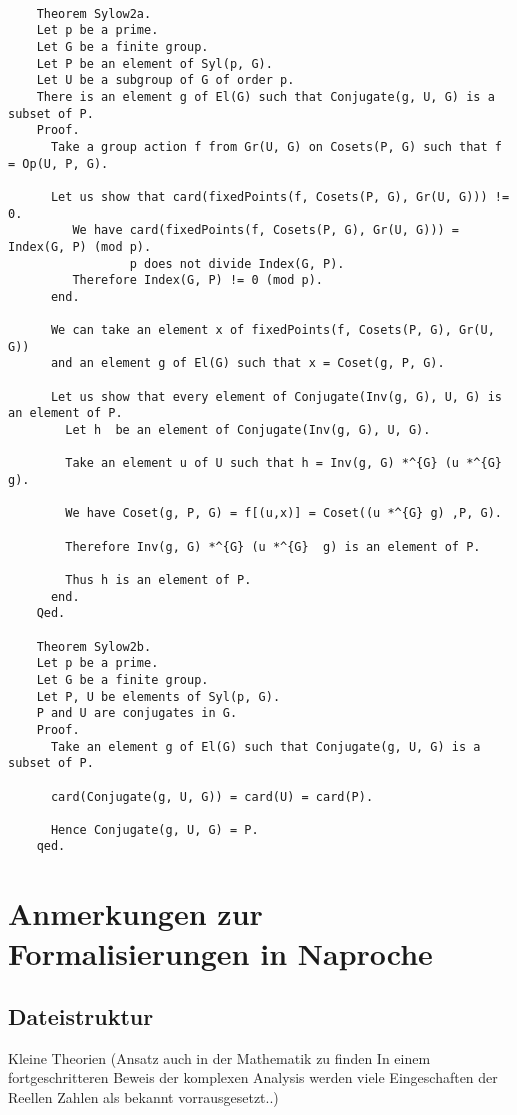 \documentclass[a4paper,12pt]{scrartcl}
\begin{document}
\begin{lstlisting}
	
	Theorem Sylow2a.
	Let p be a prime.
	Let G be a finite group.
	Let P be an element of Syl(p, G).
	Let U be a subgroup of G of order p.
	There is an element g of El(G) such that Conjugate(g, U, G) is a subset of P.
	Proof.
	  Take a group action f from Gr(U, G) on Cosets(P, G) such that f = Op(U, P, G).
	  
	  Let us show that card(fixedPoints(f, Cosets(P, G), Gr(U, G))) !=  0.
		 We have card(fixedPoints(f, Cosets(P, G), Gr(U, G))) = Index(G, P) (mod p).
				 p does not divide Index(G, P).
		 Therefore Index(G, P) != 0 (mod p).
	  end.
	  
	  We can take an element x of fixedPoints(f, Cosets(P, G), Gr(U, G))
	  and an element g of El(G) such that x = Coset(g, P, G).
	  
	  Let us show that every element of Conjugate(Inv(g, G), U, G) is an element of P.
		Let h  be an element of Conjugate(Inv(g, G), U, G).
	
		Take an element u of U such that h = Inv(g, G) *^{G} (u *^{G}  g).
	
		We have Coset(g, P, G) = f[(u,x)] = Coset((u *^{G} g) ,P, G).
	
		Therefore Inv(g, G) *^{G} (u *^{G}  g) is an element of P.
	
		Thus h is an element of P.
	  end.
	Qed.
	
	Theorem Sylow2b.
	Let p be a prime.
	Let G be a finite group.
	Let P, U be elements of Syl(p, G).
	P and U are conjugates in G.
	Proof.
	  Take an element g of El(G) such that Conjugate(g, U, G) is a subset of P.
	
	  card(Conjugate(g, U, G)) = card(U) = card(P).
	
	  Hence Conjugate(g, U, G) = P.
	qed.
\end{lstlisting}


\section{Anmerkungen zur Formalisierungen in Naproche}

\subsection{Dateistruktur}

Kleine Theorien
(Ansatz auch in der Mathematik zu finden In einem fortgeschritteren Beweis der komplexen Analysis werden viele Eingeschaften der Reellen Zahlen als bekannt vorrausgesetzt..)
\end{document}
